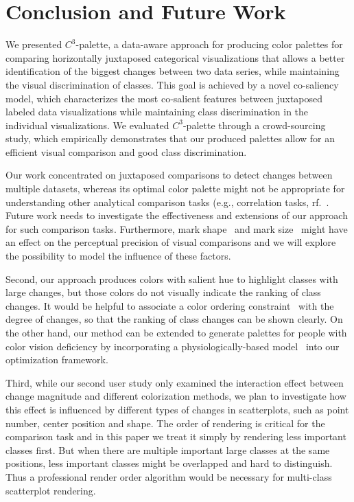 \section {Conclusion and Future Work}
We presented $C^3$-palette, a data-aware approach for producing color
palettes for comparing horizontally juxtaposed categorical visualizations that allows a better identification of the biggest changes between two data series, while maintaining the visual discrimination of classes. This goal is
achieved by a  novel co-saliency model, which characterizes the most co-salient features between juxtaposed labeled data visualizations while maintaining class discrimination in the individual visualizations. We evaluated $C^3$-palette through a crowd-sourcing study, which empirically demonstrates that our produced
palettes allow for an efficient visual comparison and good class discrimination.

Our work concentrated on juxtaposed comparisons to detect changes between multiple datasets, whereas its optimal color palette might not be appropriate for understanding other analytical comparison tasks (e.g., correlation tasks, rf.~\cite{Ondov19}. Future work needs to investigate the effectiveness and extensions of our approach for such comparison tasks. Furthermore, mark shape~\cite{liu2021data} and mark size~\cite{smart2019measuring}  might have an effect on the perceptual precision of visual comparisons and we will explore the possibility to model the influence of these factors. %


Second, our approach produces colors with salient hue to highlight classes with large changes, but those colors do not visually indicate the ranking of class changes. It would be helpful to associate a color ordering constraint~\cite{Bujack18} with the degree of changes, so that the ranking of class changes can be shown clearly. On the other hand, our method can be extended to generate palettes for people with color vision deficiency by incorporating a physiologically-based model~\cite{machado2009physiologically} into our optimization framework.

Third, while our second user study only examined the interaction effect between change magnitude and different colorization methods, we plan to investigate how this effect is influenced by different types of changes in scatterplots, such as point number, center position and shape.
The order of rendering is critical for the comparison task and in this paper we treat it simply by rendering less important classes first. But when there are multiple important large classes at the same positions, less important classes might be overlapped and hard to distinguish. Thus a professional render order algorithm would be necessary for multi-class scatterplot rendering.

